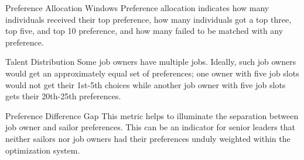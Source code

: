 Preference Allocation Windows
Preference allocation indicates how many individuals received their top preference, how many individuals got a top three, top five, and top 10 preference, and how many failed to be matched with any preference.

Talent Distribution
Some job owners have multiple jobs. Ideally, such job owners would get an approximately equal set of preferences; one owner with five job slots would not get their 1st-5th choices while another job owner with five job slots gets their 20th-25th preferences. 

Preference Difference Gap
This metric helps to illuminate the separation between job owner and sailor preferences. This can be an indicator for senior leaders that neither sailors nor job owners had their preferences unduly weighted within the optimization system.  
